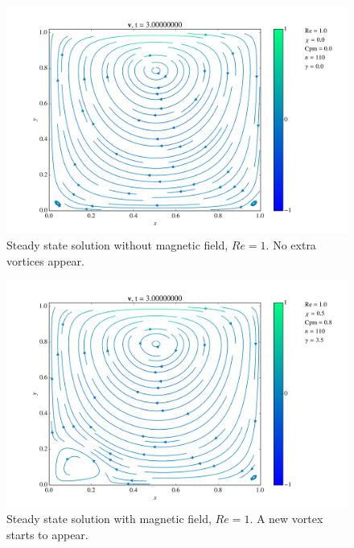 \documentclass[journal]{IEEEtran}
\begin{document}
\begin{figure}[!t]
\centering
\includegraphics[width=\linewidth]{figures/Re001/n/vectorField}
\caption{Steady state solution without magnetic field, $\mathit{Re}=1$. No extra vortices appear.\label{Re001nVectorField}}
\end{figure}

\begin{figure}[!t]
\centering
\includegraphics[width=\linewidth]{figures/Re001/w/vectorField}
\caption{Steady state solution with magnetic field, $\mathit{Re}=1$. A new vortex starts to appear. \label{Re001wVectorField}}
\end{figure}
\end{document}
